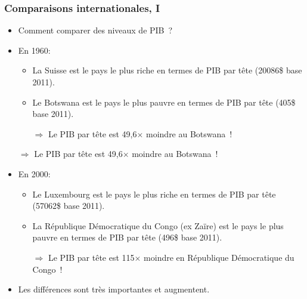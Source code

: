 \documentclass[10pt,notheorems]{beamer}
\theoremstyle{plain}
\theoremstyle{definition} %
\begin{document}
\begin{frame}
  \frametitle{Comparaisons internationales, I}

  \bigskip

  \begin{itemize}

  \item Comment comparer des niveaux de PIB~?\newline

  \item En 1960:

    \begin{itemize}
    \item La Suisse est le pays le plus riche en termes de PIB par tête (20086\$ base 2011).
    \item Le Botswana est le pays le plus pauvre en termes de PIB par tête (405\$ base 2011).
    \item[$\Rightarrow$] Le PIB par tête est 49,6$\times$ moindre au Botswana~!\newline
    \end{itemize}

    $\Rightarrow$ Le PIB par tête est 49,6$\times$ moindre au Botswana~!\newline

  \item En 2000:

    \begin{itemize}
    \item Le Luxembourg est le pays le plus riche en termes de PIB par tête (57062\$ base 2011).
    \item La République Démocratique du Congo (ex Zaïre) est le pays le plus pauvre en termes de PIB par tête (496\$ base 2011).
    \item[$\Rightarrow$] Le PIB par tête est 115$\times$ moindre en République Démocratique du Congo~!\newline
    \end{itemize}

  \item Les différences sont très importantes et augmentent.\newline

  \end{itemize}

\end{frame}
\end{document}
